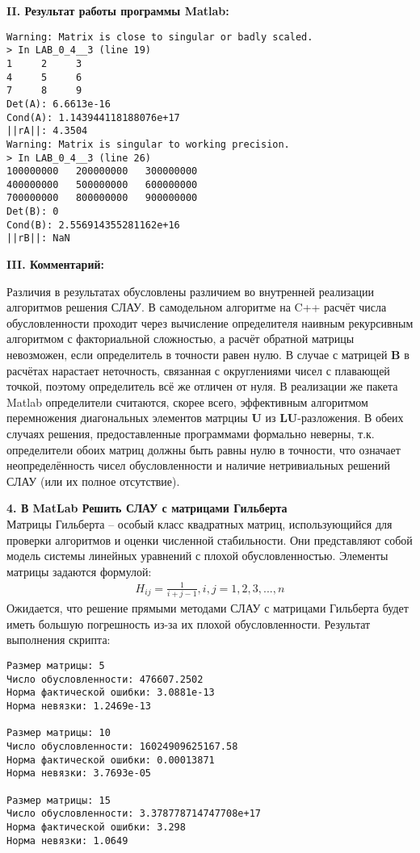 \newpage
{\large\bf II. Результат работы программы Matlab:}
\begin{multicols}{2}
{\singlespacing
\begin{verbatim}
Warning: Matrix is close to singular or badly scaled.
> In LAB_0_4__3 (line 19)
1     2     3
4     5     6
7     8     9
Det(A): 6.6613e-16
Cond(A): 1.143944118188076e+17
||rA||: 4.3504
Warning: Matrix is singular to working precision.
> In LAB_0_4__3 (line 26)
100000000   200000000   300000000
400000000   500000000   600000000
700000000   800000000   900000000
Det(B): 0
Cond(B): 2.556914355281162e+16
||rB||: NaN
\end{verbatim}}
\end{multicols}
{\large\bf III. Комментарий:}
\begin{multicols}{2}
Различия в результатах обусловлены различием во внутренней реализации алгоритмов решения СЛАУ. В самодельном алгоритме на C++ расчёт числа обусловленности проходит через вычисление определителя наивным рекурсивным алгоритмом с факториальной сложностью, а расчёт обратной матрицы невозможен, если определитель в точности равен нулю. В случае с матрицей $\mathbf{B}$ в расчётах нарастает неточность, связанная с округлениями чисел с плавающей точкой, поэтому определитель всё же отличен от нуля. В реализации же пакета Matlab определители считаются, скорее всего, эффективным алгоритмом перемножения диагональных элементов матрциы $\mathbf{U}$ из $\mathbf{LU}$-разложения. В обеих случаях решения, предоставленные программами формально неверны, т.к. определители обоих матриц должны быть равны нулю в точности, что означает неопределённость чисел обусловленности и наличие нетривиальных решений СЛАУ (или их полное отсутствие).
\end{multicols}
{\Large{\textbf{4. В MatLab Решить СЛАУ с матрицами Гильберта}}}\\
Матрицы Гильберта -- особый класс квадратных матриц, использующийся для проверки алгоритмов и оценки численной стабильности. Они представляют собой модель системы линейных уравнений с плохой обусловленностью. Элементы матрицы задаются формулой:
\begin{align}
    H_{ij}={\frac {1}{i+j-1}},i,j=1,2,3,...,n
\end{align}
Ожидается, что решение прямыми методами СЛАУ с матрицами Гильберта будет иметь большую погрешность из-за их плохой обусловленности. Результат выполнения скрипта:
{\singlespacing\begin{verbatim}
Размер матрицы: 5
Число обусловленности: 476607.2502
Норма фактической ошибки: 3.0881e-13
Норма невязки: 1.2469e-13

Размер матрицы: 10
Число обусловленности: 16024909625167.58
Норма фактической ошибки: 0.00013871
Норма невязки: 3.7693e-05

Размер матрицы: 15
Число обусловленности: 3.378778714747708e+17
Норма фактической ошибки: 3.298
Норма невязки: 1.0649
\end{verbatim}}
